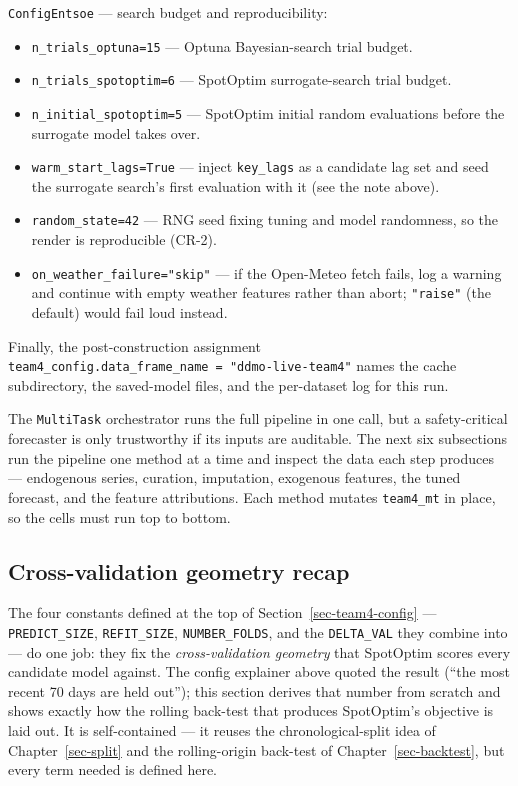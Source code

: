 \documentclass[
  english,
  letterpaper,
]{scrbook}
\providecommand{\tightlist}{%
  \setlength{\itemsep}{0pt}\setlength{\parskip}{0pt}}
\begin{document}
\texttt{ConfigEntsoe} --- search budget and reproducibility:

\begin{itemize}
\tightlist
\item
  \texttt{n\_trials\_optuna=15} --- Optuna Bayesian-search trial budget.
\item
  \texttt{n\_trials\_spotoptim=6} --- SpotOptim surrogate-search trial
  budget.
\item
  \texttt{n\_initial\_spotoptim=5} --- SpotOptim initial random
  evaluations before the surrogate model takes over.
\item
  \texttt{warm\_start\_lags=True} --- inject \texttt{key\_lags} as a
  candidate lag set and seed the surrogate search's first evaluation
  with it (see the note above).
\item
  \texttt{random\_state=42} --- RNG seed fixing tuning and model
  randomness, so the render is reproducible (CR-2).
\item
  \texttt{on\_weather\_failure="skip"} --- if the Open-Meteo fetch
  fails, log a warning and continue with empty weather features rather
  than abort; \texttt{"raise"} (the default) would fail loud instead.
\end{itemize}

Finally, the post-construction assignment
\texttt{team4\_config.data\_frame\_name\ =\ "ddmo-live-team4"} names the
cache subdirectory, the saved-model files, and the per-dataset log for
this run.

The \texttt{MultiTask} orchestrator runs the full pipeline in one call,
but a safety-critical forecaster is only trustworthy if its inputs are
auditable. The next six subsections run the pipeline one method at a
time and inspect the data each step produces --- endogenous series,
curation, imputation, exogenous features, the tuned forecast, and the
feature attributions. Each method mutates \texttt{team4\_mt} in place,
so the cells must run top to bottom.

\subsection{Cross-validation geometry
recap}\label{sec-cross-validation-geometry}

The four constants defined at the top of Section~\ref{sec-team4-config}
--- \texttt{PREDICT\_SIZE}, \texttt{REFIT\_SIZE},
\texttt{NUMBER\_FOLDS}, and the \texttt{DELTA\_VAL} they combine into
--- do one job: they fix the \emph{cross-validation geometry} that
SpotOptim scores every candidate model against. The config explainer
above quoted the result (``the most recent 70 days are held out''); this
section derives that number from scratch and shows exactly how the
rolling back-test that produces SpotOptim's objective is laid out. It is
self-contained --- it reuses the chronological-split idea of
Chapter~\ref{sec-split} and the rolling-origin back-test of
Chapter~\ref{sec-backtest}, but every term needed is defined here.
\end{document}
